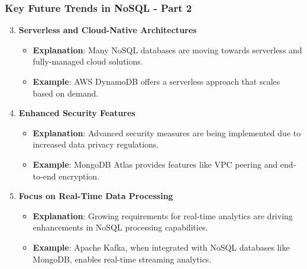 \documentclass[aspectratio=169]{beamer}
\begin{document}
\begin{frame}[fragile]
    \frametitle{Key Future Trends in NoSQL - Part 2}
    \begin{enumerate}
        \setcounter{enumi}{2} %
        \item \textbf{Serverless and Cloud-Native Architectures}
            \begin{itemize}
                \item \textbf{Explanation}: Many NoSQL databases are moving towards serverless and fully-managed cloud solutions.
                \item \textbf{Example}: AWS DynamoDB offers a serverless approach that scales based on demand.
            \end{itemize}

        \item \textbf{Enhanced Security Features}
            \begin{itemize}
                \item \textbf{Explanation}: Advanced security measures are being implemented due to increased data privacy regulations.
                \item \textbf{Example}: MongoDB Atlas provides features like VPC peering and end-to-end encryption.
            \end{itemize}

        \item \textbf{Focus on Real-Time Data Processing}
            \begin{itemize}
                \item \textbf{Explanation}: Growing requirements for real-time analytics are driving enhancements in NoSQL processing capabilities.
                \item \textbf{Example}: Apache Kafka, when integrated with NoSQL databases like MongoDB, enables real-time streaming analytics.
            \end{itemize}
    \end{enumerate}
\end{frame}
\end{document}
